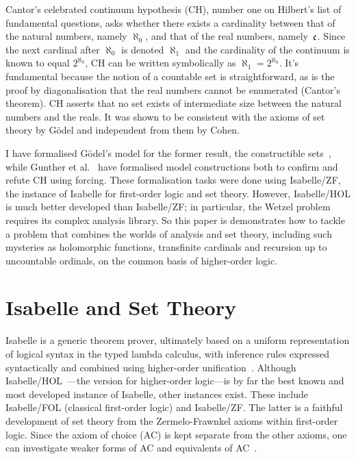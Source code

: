 \documentclass[runningheads]{llncs}
\begin{document}
Cantor's celebrated continuum hypothesis (CH), number one on Hilbert's list of fundamental questions, asks whether there exists a cardinality between that of the natural numbers, namely $\aleph_0$, and that of the real numbers, namely~$\frak{c}$.
Since the next cardinal after $\aleph_0$ is denoted $\aleph_1$ and the cardinality of the continuum is known to equal $2^{\aleph_0}$,  CH can be written symbolically as $\aleph_1 = 2^{\aleph_0}$.
It's fundamental because the notion of a countable set is straightforward, as is the proof by diagonalisation that the real numbers cannot be enumerated (Cantor's theorem).
CH asserts that no set exists of intermediate size between the natural numbers and the reals.
It was shown to be consistent with the axioms of set theory by Gödel and independent from them by Cohen.

I have formalised Gödel's model for the former result, the constructible sets~\cite{paulson-consistency}, while
Gunther et al.\ \cite{Independence_CH-AFP} have formalised model constructions both to confirm and refute CH using forcing.
These formalisation tasks were done using Isabelle/ZF, the instance of Isabelle for first-order logic and set theory.
However, Isabelle/HOL is much better developed than Isabelle/ZF;
in particular, the Wetzel problem requires its complex analysis library. So this paper is demonstrates how to tackle a problem that combines the worlds of analysis and set theory, including such mysteries as holomorphic functions, transfinite cardinals and recursion up to uncountable ordinals, on the common basis of higher-order logic.


\section{Isabelle and Set Theory}

Isabelle is a generic theorem prover, ultimately based on a uniform representation of logical syntax in the typed lambda calculus, with inference rules expressed syntactically and combined using higher-order unification~\cite{paulson-found}. Although Isabelle/HOL~\cite{isa-tutorial}---the version for higher-order logic---is by far the best known and most developed instance of Isabelle, other instances exist. These include Isabelle/FOL (classical first-order logic) and Isabelle/ZF\@.
The latter is a faithful development of set theory from the Zermelo-Frawnkel axioms within first-order logic.
Since the axiom of choice (AC) is kept separate from the other axioms, one can investigate weaker forms of AC and equivalents of AC~\cite{paulson-gr}. 
\end{document}
